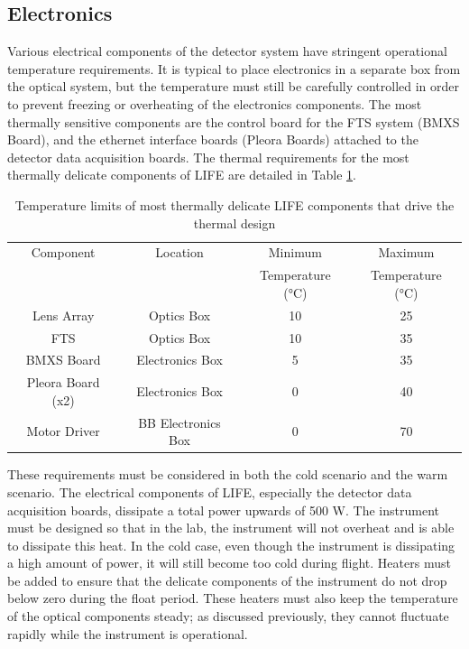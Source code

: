 \subsection{Electronics}
Various electrical components of the detector system have stringent operational temperature requirements. It is typical to place electronics in a separate box from the optical system, but the temperature must still be carefully controlled in order to prevent freezing or overheating of the electronics components. The most thermally sensitive components are the control board for the FTS system (BMXS Board), and the ethernet interface boards (Pleora Boards) attached to the detector data acquisition boards. The thermal requirements for the most thermally delicate components of LIFE are detailed in Table \ref{therm_req_table}. 

\begin{table}[h]
\begin{center}
\begin{tabular}{ |c|c|c|c| }
 \hline
 \rowcolor{lightgray}
 Component & Location & Minimum & Maximum \\
 \rowcolor{lightgray}
  &  & Temperature (°C) & Temperature (°C) \\
  \hline
  \hline
 Lens Array & Optics Box & 10 & 25 \\
 \hline
 FTS & Optics Box & 10 & 35 \\
 \hline
 BMXS Board & Electronics Box & 5 & 35 \\
 \hline
 Pleora Board (x2) & Electronics Box & 0 & 40 \\
 \hline
 Motor Driver & BB Electronics Box & 0 & 70 \\
 \hline
\end{tabular}
\end{center}
\caption{Temperature limits of most thermally delicate LIFE components that drive the thermal design}
 \label{therm_req_table}
\end{table}

These requirements must be considered in both the cold scenario and the warm scenario. The electrical components of LIFE, especially the detector data acquisition boards, dissipate a total power upwards of 500 W. The instrument must be designed so that in the lab, the instrument will not overheat and is able to dissipate this heat. In the cold case, even though the instrument is dissipating a high amount of power, it will still become too cold during flight. Heaters must be added to ensure that the delicate components of the instrument do not drop below zero during the float period. These heaters must also keep the temperature of the optical components steady; as discussed previously, they cannot fluctuate rapidly while the instrument is operational. 

